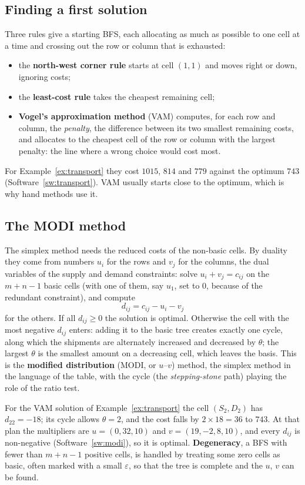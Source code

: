 \documentclass[11pt,a4paper]{article}
\numberwithin{equation}{section}
\theoremstyle{definition}
\begin{document}
\subsection{Finding a first solution}
\label{ssec:initial}

Three rules give a starting BFS, each allocating as much as possible to one cell at a time and crossing out the row or column that is exhausted:
\begin{itemize}
\item the \textbf{north-west corner rule} starts at cell $(1, 1)$ and moves right or down, ignoring costs;
\item the \textbf{least-cost rule} takes the cheapest remaining cell;
\item \textbf{Vogel's approximation method} (VAM) computes, for each row and column, the \emph{penalty}, the difference between its two smallest remaining costs, and allocates to the cheapest cell of the row or column with the largest penalty: the line where a wrong choice would cost most.
\end{itemize}
For Example~\ref{ex:transport} they cost $1015$, $814$ and $779$ against the optimum $743$ (Software~\ref{sw:transport}). VAM usually starts close to the optimum, which is why hand methods use it.

\subsection{The MODI method}
\label{ssec:modi}

The simplex method needs the reduced costs of the non-basic cells. By duality they come from numbers $u_i$ for the rows and $v_j$ for the columns, the dual variables of the supply and demand constraints: solve $u_i + v_j = c_{ij}$ on the $m + n - 1$ basic cells (with one of them, say $u_1$, set to $0$, because of the
redundant constraint), and compute
\[
d_{ij} = c_{ij} - u_i - v_j
\]
for the others. If all $d_{ij} \geq 0$ the solution is optimal. Otherwise the cell with the most negative $d_{ij}$ enters: adding it to the basic tree creates exactly one cycle, along which the shipments are alternately increased and decreased by $\theta$; the largest $\theta$ is the smallest amount on a decreasing cell, which
leaves the basis. This is the \textbf{modified distribution} (MODI, or $u$--$v$) method, the simplex method in the language of the table, with the cycle (the \emph{stepping-stone} path) playing the role of the ratio test.

For the VAM solution of Example~\ref{ex:transport} the cell $(S_2, D_2)$ has $d_{22} = -18$; its cycle allows $\theta = 2$, and the cost falls by $2 \times 18 = 36$ to $743$. At that plan the multipliers are $u = (0, 32, 10)$ and $v = (19, -2, 8, 10)$, and every $d_{ij}$ is non-negative (Software~\ref{sw:modi}), so it is optimal.
\textbf{Degeneracy}, a BFS with fewer than $m + n - 1$ positive cells, is handled by treating some zero cells as basic, often marked with a small $\varepsilon$, so that the tree is complete and the $u$, $v$ can be found.
\end{document}
